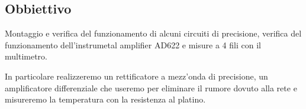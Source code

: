 \subsection{Obbiettivo}

Montaggio e verifica del funzionamento di alcuni circuiti di precisione,
verifica del funzionamento dell'instrumetal amplifier AD622 e misure a 4 fili con
il multimetro.

In particolare realizzeremo un rettificatore a mezz'onda di precisione,
un amplificatore differenziale che useremo per eliminare il rumore dovuto alla rete
e misureremo la temperatura con la resistenza al platino.

